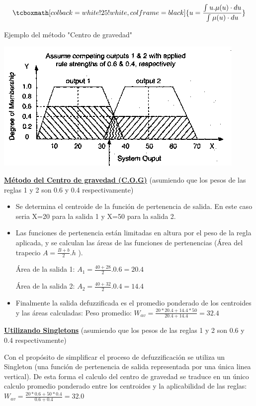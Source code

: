 \begin{center}
\begin{equation}
        \tcboxmath[colback=white!25!white,colframe=black]
        { u = \frac{ \int_{}^{} u. \mu(u) \cdot du }{ \int_{}^{} \mu(u) \cdot du } }  
\end{equation}
\end{center}

Ejemplo del método "Centro de gravedad" \par

\begin{center}
    \includegraphics[scale=0.7]{Tesis/Capitulos/02_MARCO_TEORICO/img/COG.png}
\end{center}

\underline{\textbf{Método del Centro de gravedad (C.O.G)}} (asumiendo que los pesos de las reglas 1 y 2 son 0.6 y 0.4 respectivamente)

\begin{itemize}
    \item Se determina el centroide de la función de pertenencia de salida. En este caso seria X=20 para la salida 1 y X=50 para la salida 2.
    \item Las funciones de pertenencia están limitadas en altura por el peso de la regla aplicada, y se calculan las áreas de las funciones de pertenencias (Área del trapecio $A=\frac{B+b}{2}.h$ ).\par
    Área de la salida 1: $A_1 =\frac{40+28}{2}.0.6 = 20.4 $ \par
    Área de la salida 2: $A_2 =\frac{40+32}{2}.0.4 = 14.4 $ \par
    \item Finalmente la salida defuzzificada es el promedio ponderado de los centroides y las áreas calculadas: Peso promedio: $W_{av} =\frac{20*20.4+14.4*50}{20.4+14.4} = 32.4 $
\end{itemize}

\underline{\textbf{Utilizando Singletons}} (asumiendo que los pesos de las reglas 1 y 2 son 0.6 y 0.4 respectivamente)

Con el propósito de simplificar el proceso de defuzzificación se utiliza un Singleton (una función de pertenencia de salida representada por una única linea vertical). De esta forma el calculo del centro de gravedad se traduce en un único calculo promedio ponderado entre los centroides y la aplicabilidad de las reglas: $W_{av} =\frac{20*0.6+50*0.4}{0.6+0.4} = 32.0 $